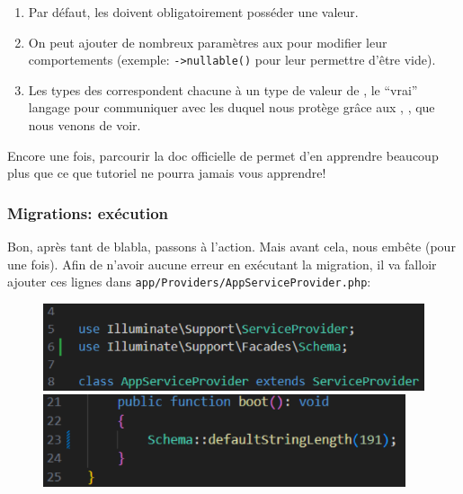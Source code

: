 \documentclass[internal]{nhitec_design}
\begin{document}
\begin{enumerate}
    \item Par défaut, les \columns{} doivent obligatoirement posséder une valeur.
    \item On peut ajouter de nombreux paramètres aux \columns{} pour modifier leur comportements (exemple: \verb|->nullable()| pour leur permettre d'être vide).
    \item Les types des \column{} correspondent chacune à un type de valeur de \mysql{}, le ``vrai'' langage pour communiquer avec les \db{} duquel \laravel{} nous protège grâce aux \models{}, \migrations{}, \tables{} que nous venons de voir.
\end{enumerate}

Encore une fois, parcourir la doc officielle de \laravel{} permet d'en apprendre beaucoup plus que ce que tutoriel ne pourra jamais vous apprendre!

\subsubsection{Migrations: exécution}

Bon, après tant de blabla, passons à l'action. Mais avant cela, \laravel{} nous embête (pour une fois). Afin de n'avoir aucune erreur en exécutant la migration, il va falloir ajouter ces lignes dans \verb|app/Providers/AppServiceProvider.php|:

\begin{figure}[!h]
    \centering
    \begin{minipage}{0.49\textwidth}
         \centering
         \includegraphics[width=\textwidth]{figures-C1/appservice_2.pdf}
    \end{minipage}
    \begin{minipage}{0.49\textwidth}
         \centering
         \includegraphics[width=0.95\textwidth]{figures-C1/appservice_1.pdf}
    \end{minipage}
\end{figure}
\end{document}
